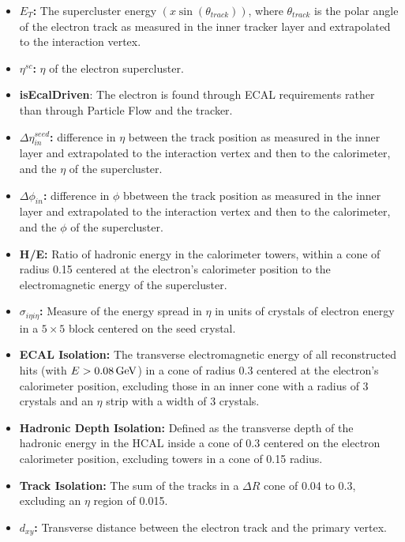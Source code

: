 \begin{itemize}
\itemsep-1em 
\item \textbf{$E_T$:} The supercluster energy $(x \sin(\theta_{track}))$, where $\theta_{track}$ is the polar angle of the electron track as measured in the inner tracker layer and extrapolated to the interaction vertex. \newline
\item \textbf{$\eta^{sc}$:} $\eta$ of the electron supercluster.\newline
\item \textbf{isEcalDriven}: The electron is found through ECAL requirements rather than through Particle Flow and the tracker.\newline
\item \textbf{$\Delta \eta_{in}^{seed}$:} difference in $\eta$ between the track position as measured in the inner layer and extrapolated to the interaction vertex and then to the calorimeter, and the $\eta$ of the supercluster. \newline
\item \textbf{$\Delta\phi_{in}$:} difference in $\phi$ bbetween the track position as measured in the inner layer and extrapolated to the interaction vertex and then to the calorimeter, and the $\phi$ of the supercluster. \newline
\item \textbf{H/E:} Ratio of hadronic energy in the calorimeter towers, within a cone of radius 0.15 centered at the electron's calorimeter position to the electromagnetic energy of the supercluster.\newline
\item \textbf{$\sigma_{i \eta i \eta}$:} Measure of the energy spread in $\eta$ in units of crystals of electron energy in a $5 \times 5$ block centered on the seed crystal.\newline
\item \textbf{ECAL Isolation:} The transverse electromagnetic energy of all reconstructed hits (with $E > 0.08 \,\text{Ge\hspace{-.08em}V}$) in a cone of radius 0.3 centered at the electron's calorimeter position, excluding those in an inner cone with a radius of 3 crystals and an $\eta$ strip with a width of 3 crystals.\newline
\item \textbf{Hadronic Depth Isolation:} Defined as the transverse depth of the hadronic energy in the HCAL inside a cone of 0.3 centered on the electron calorimeter position, excluding towers in a cone of 0.15 radius.\newline
\item \textbf{Track \PT Isolation:} The sum \PT of the tracks in a $\Delta R$ cone of 0.04 to 0.3, excluding an $\eta$ region of 0.015.\newline
\item \textbf{$d_{xy}$:} Transverse distance between the electron track and the primary vertex.\newline
\end{itemize}

